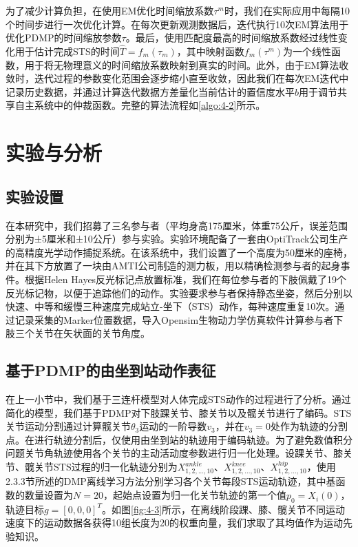 为了减少计算负担，在使用EM优化时间缩放系数$\tau^{m}$时，我们在实际应用中每隔10个时间步进行一次优化计算。在每次更新观测数据后，迭代执行10次EM算法用于优化PDMP的时间缩放参数$\tau$。最后，使用匹配度最高的时间缩放系数经过线性变化用于估计完成STS的时间$\hat T=f_m(\tau_m)$，其中映射函数$f_m(\tau^m)$为一个线性函数，用于将无物理意义的时间缩放系数映射到真实的时间。此外，由于EM算法收敛时，迭代过程的参数变化范围会逐步缩小直至收敛，因此我们在每次EM迭代中记录历史数据，并通过计算迭代数据方差量化当前估计的置信度水平$b$用于调节共享自主系统中的仲裁函数。完整的算法流程如\ref{algo:4-2}所示。


\section{实验与分析}
\subsection{实验设置} 
在本研究中，我们招募了三名参与者（平均身高175厘米，体重75公斤，误差范围分别为±5厘米和±10公斤）参与实验。实验环境配备了一套由OptiTrack公司生产的高精度光学动作捕捉系统。在该系统中，我们设置了一个高度为50厘米的座椅，并在其下方放置了一块由AMTI公司制造的测力板，用以精确检测参与者的起身事件。根据Helen Hayes反光标记点放置标准，我们在每位参与者的下肢佩戴了19个反光标记物，以便于追踪他们的动作。实验要求参与者保持静态坐姿，然后分别以快速、中等和缓慢三种速度完成站立-坐下（STS）动作，每种速度重复10次。通过记录采集的Marker位置数据，导入Opensim生物动力学仿真软件计算参与者下肢三个关节在矢状面的关节角度。

\subsection{基于PDMP的由坐到站动作表征} 
在上一小节中，我们基于三连杆模型对人体完成STS动作的过程进行了分析。通过简化的模型，我们基于PDMP对下肢踝关节、膝关节以及髋关节进行了编码。STS关节运动分割通过计算髋关节$\theta_3$运动的一阶导数$v_3$，并在$v_3=0$处作为轨迹的分割点。在进行轨迹分割后，仅使用由坐到站的轨迹用于编码轨迹。为了避免数值积分问题关节角轨迹使用各个关节的主动活动度参数进行归一化处理。设踝关节、膝关节、髋关节STS过程的归一化轨迹分别为$X_{1,2,...,10}^{ankle}$、$X_{1,2,...,10}^{knee}$、$X_{1,2,...,10}^{hip}$，使用2.3.3节所述的DMP离线学习方法分别学习各个关节每段STS运动轨迹，其中基函数的数量设置为$N=20$，起始点设置为归一化关节轨迹的第一个值$p_0=X_i(0)$，轨迹目标$g=[0,0,0]^T$。如图\ref{fig:4-3}所示，在离线阶段踝、膝、髋关节不同运动速度下的运动数据各获得10组长度为20的权重向量，我们求取了其均值作为运动先验知识。

